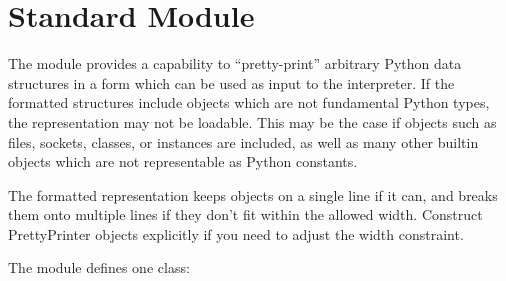 
\section{Standard Module }
\label{module-pprint}

The  module provides a capability to ``pretty-print''
arbitrary Python data structures in a form which can be used as input
to the interpreter.  If the formatted structures include objects which
are not fundamental Python types, the representation may not be
loadable.  This may be the case if objects such as files, sockets,
classes, or instances are included, as well as many other builtin
objects which are not representable as Python constants.

The formatted representation keeps objects on a single line if it can,
and breaks them onto multiple lines if they don't fit within the
allowed width.  Construct PrettyPrinter objects explicitly if you need
to adjust the width constraint.

The  module defines one class:



